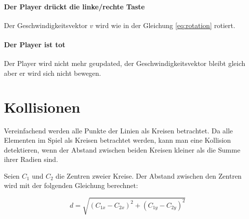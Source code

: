 \documentclass[doktyp=studarbeit]{TUBAFarbeiten}
\begin{document}
\paragraph{Der Player drückt die linke/rechte Taste}
Der Geschwindigkeitsvektor $v$ wird wie in der Gleichung \ref{eq:rotation}
rotiert.

\paragraph{Der Player ist tot}
Der Player wird nicht mehr geupdated, der Geschwindigkeitsvektor bleibt gleich
aber er wird sich nicht bewegen.

\section{Kollisionen}

Vereinfachend werden alle Punkte der Linien als Kreisen betrachtet.
Da alle Elementen im Spiel als Kreisen betrachtet werden, kann man eine Kollision
detektieren, wenn der Abstand zwischen beiden Kreisen kleiner als die Summe ihrer Radien sind.

Seien $C_{1}$ und $C_{2}$ die Zentren zweier Kreise. Der Abstand zwischen den 
Zentren wird mit der folgenden Gleichung berechnet:

\begin{equation}
    d = \sqrt{(C_{1x} - C_{2x})^2 + (C_{1y} - C_{2y})^2}
\end{equation}
\end{document}

